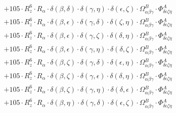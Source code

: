 \documentclass{article}
\begin{document}
\begin{equation}
\begin{array}{c}
 \\[0.2em] 		 + 105 \cdot R_{z}^{6} \cdot R_{\alpha{}} \cdot \delta{}\left(\beta{}, \delta{}\right) \cdot \delta{}\left(\gamma{}, \eta{}\right) \cdot \delta{}\left(\epsilon{}, \zeta{}\right) \cdot \Omega{}^{B}_{\alpha{}\beta{}\gamma{}} \cdot \Phi{}^{A}_{\delta{}\epsilon{}\zeta{}\eta{}} 
 \\[0.2em] 		 + 105 \cdot R_{z}^{6} \cdot R_{\alpha{}} \cdot \delta{}\left(\beta{}, \epsilon{}\right) \cdot \delta{}\left(\gamma{}, \delta{}\right) \cdot \delta{}\left(\zeta{}, \eta{}\right) \cdot \Omega{}^{B}_{\alpha{}\beta{}\gamma{}} \cdot \Phi{}^{A}_{\delta{}\epsilon{}\zeta{}\eta{}} 
 \\[0.2em] 		 + 105 \cdot R_{z}^{6} \cdot R_{\alpha{}} \cdot \delta{}\left(\beta{}, \epsilon{}\right) \cdot \delta{}\left(\gamma{}, \zeta{}\right) \cdot \delta{}\left(\delta{}, \eta{}\right) \cdot \Omega{}^{B}_{\alpha{}\beta{}\gamma{}} \cdot \Phi{}^{A}_{\delta{}\epsilon{}\zeta{}\eta{}} 
 \\[0.2em] 		 + 105 \cdot R_{z}^{6} \cdot R_{\alpha{}} \cdot \delta{}\left(\beta{}, \epsilon{}\right) \cdot \delta{}\left(\gamma{}, \eta{}\right) \cdot \delta{}\left(\delta{}, \zeta{}\right) \cdot \Omega{}^{B}_{\alpha{}\beta{}\gamma{}} \cdot \Phi{}^{A}_{\delta{}\epsilon{}\zeta{}\eta{}} 
 \\[0.2em] 		 + 105 \cdot R_{z}^{6} \cdot R_{\alpha{}} \cdot \delta{}\left(\beta{}, \zeta{}\right) \cdot \delta{}\left(\gamma{}, \delta{}\right) \cdot \delta{}\left(\epsilon{}, \eta{}\right) \cdot \Omega{}^{B}_{\alpha{}\beta{}\gamma{}} \cdot \Phi{}^{A}_{\delta{}\epsilon{}\zeta{}\eta{}} 
 \\[0.2em] 		 + 105 \cdot R_{z}^{6} \cdot R_{\alpha{}} \cdot \delta{}\left(\beta{}, \zeta{}\right) \cdot \delta{}\left(\gamma{}, \epsilon{}\right) \cdot \delta{}\left(\delta{}, \eta{}\right) \cdot \Omega{}^{B}_{\alpha{}\beta{}\gamma{}} \cdot \Phi{}^{A}_{\delta{}\epsilon{}\zeta{}\eta{}} 
 \\[0.2em] 		 + 105 \cdot R_{z}^{6} \cdot R_{\alpha{}} \cdot \delta{}\left(\beta{}, \zeta{}\right) \cdot \delta{}\left(\gamma{}, \eta{}\right) \cdot \delta{}\left(\delta{}, \epsilon{}\right) \cdot \Omega{}^{B}_{\alpha{}\beta{}\gamma{}} \cdot \Phi{}^{A}_{\delta{}\epsilon{}\zeta{}\eta{}} 
 \\[0.2em] 		 + 105 \cdot R_{z}^{6} \cdot R_{\alpha{}} \cdot \delta{}\left(\beta{}, \eta{}\right) \cdot \delta{}\left(\gamma{}, \delta{}\right) \cdot \delta{}\left(\epsilon{}, \zeta{}\right) \cdot \Omega{}^{B}_{\alpha{}\beta{}\gamma{}} \cdot \Phi{}^{A}_{\delta{}\epsilon{}\zeta{}\eta{}} 

\end{array}
\end{equation}
\end{document}
